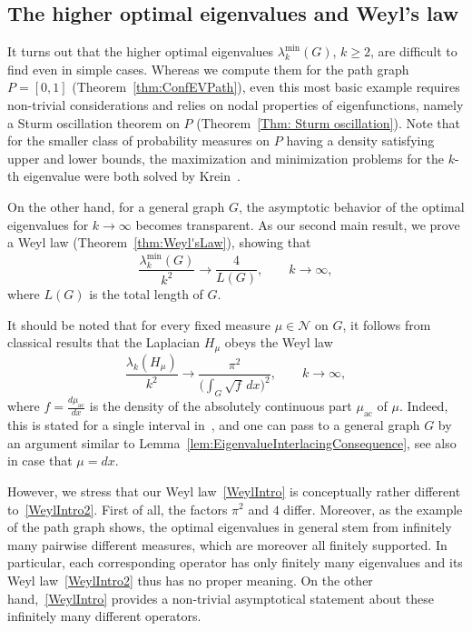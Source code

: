 \documentclass[reqno]{amsart}
\theoremstyle{plain}
\theoremstyle{definition}
\theoremstyle{remark}
\numberwithin{equation}{section}
\newcommand{\cN}{\mathcal{N}}
\begin{document}
\subsection*{The higher optimal eigenvalues and Weyl's law}
It turns out that the higher optimal eigenvalues $\lambda_k^{\min}(G)$, $ k \ge 2$, are difficult to find even in simple cases. Whereas we compute them for the path graph $P = [0,1]$ (Theorem~\ref{thm:ConfEVPath}), even this most basic example requires non-trivial considerations and relies on nodal properties of eigenfunctions, namely a Sturm oscillation theorem on $P$ (Theorem~\ref{Thm: Sturm oscillation}). Note that for the smaller class of probability measures on $P$ having a density satisfying upper and lower bounds, the maximization and minimization problems for the $k$-th eigenvalue were both solved by Krein~\cite{krein}.

On the other hand, for a general graph $G$, the asymptotic behavior of the optimal eigenvalues for $k \to  \infty$ becomes transparent. As our second main result, we prove a Weyl law (Theorem~\ref{thm:Weyl'sLaw}), showing that
\begin{equation} \label{WeylIntro}
		\frac{\lambda_k^{\min}(G)}{k^2} \to \frac{4 }{L(G)}, \qquad k \to \infty,
\end{equation}
	where $L(G)$ is the total length of $G$.%

It should be noted that for every fixed measure $\mu \in\cN$ on $G$, it follows from classical results that the Laplacian $H_\mu$ obeys the Weyl law
\begin{equation} \label{WeylIntro2}
			\frac{\lambda_k  (H_\mu)}{k^2} \to \frac{\pi^2 }{\big(\int_G \sqrt{ f } \, dx\big)^2  }, \qquad k \to \infty,
\end{equation}
where $f =\frac{d\mu_{\mathrm{ac}}}{dx}$ is the density of the absolutely continuous part $\mu_{\mathrm{ac}}$ of $\mu$. Indeed, this is stated for a single interval in~\cite[Chapter 6.8]{gk}, and one can pass to a general graph $G$ by an argument similar to Lemma~\ref{lem:EigenvalueInterlacingConsequence}, see also~\cite{BerkolaikoKuchment, kurasov2023spectral} in case that $\mu = dx$.

However, we stress that our Weyl law~\eqref{WeylIntro} is conceptually rather different to~\eqref{WeylIntro2}. First of all, the factors $\pi^2$ and $4$ differ. Moreover, as the example of the path graph shows, the optimal eigenvalues in general stem from infinitely many pairwise different measures, which are moreover all finitely supported. In particular, each corresponding operator has only finitely many eigenvalues and its Weyl law~\eqref{WeylIntro2} thus has no proper meaning. On the other hand,~\eqref{WeylIntro} provides a non-trivial asymptotical statement about these infinitely many different operators.
\end{document}
